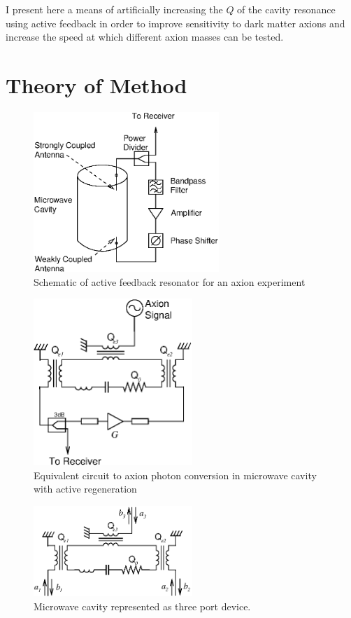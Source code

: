 \documentclass[aps,prl,twocolumn,groupedaddress]{revtex4-1}
\begin{document}
I present here a means of artificially increasing the $Q$ of the cavity resonance using active feedback in order to improve sensitivity to dark matter axions and increase the speed at which different axion masses can be tested.

\section{Theory of Method}

\begin{figure}
\includegraphics[width=7cm]{figs/experiment_schematic.eps}
\caption{\label{fig:experiment_schematic} Schematic of active feedback resonator for an axion experiment}
\end{figure}

\begin{figure}
\includegraphics[width=6cm]{figs/equivalent_circuit.eps}
\caption{\label{fig:equiv_circuit} Equivalent circuit to axion photon conversion in microwave cavity with active regeneration}
\end{figure}

\begin{figure}
\includegraphics[width=6cm]{figs/amplitude_definitions.eps}
\caption{\label{fig:amplitude_defs} Microwave cavity represented as three port device.}
\end{figure}
\end{document}
